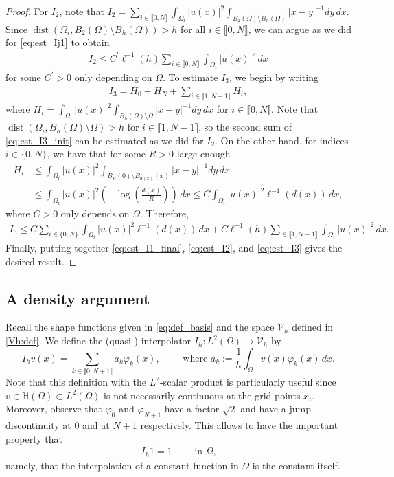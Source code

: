 \documentclass[11 pt]{article}
\newcommand\inter[1]{\llbracket #1\rrbracket}
\numberwithin{equation}{section}
\def\dist{\operatorname{dist}}
\begin{document}
\begin{proof}
For $I_2$, note that $I_2=\sum_{i\in\inter{0,N}}\int_{\Omega_i}|u(x)|^2\int_{B_2(\Omega)\setminus B_{h}(\Omega)}|x-y|^{-1}dy\,dx.$ Since $\dist(\Omega_i,B_2(\Omega)\setminus B_h(\Omega))>h$ for all $i\in\inter{0,N}$, we can argue as we did for \eqref{eq:est_Ij1} to obtain
%
\begin{align}\label{eq:est_I2}
    I_2\leq C^\prime\ell^{-1}(h)\sum_{i\in\inter{0,N}}\int_{\Omega_i}|u(x)|^2\,dx
\end{align}
%
for some $C^\prime>0$ only depending on $\Omega$. To estimate $I_3$, we begin by writing
%
\begin{align}\label{eq:est_I3_init}
    I_3=H_0+H_N+\sum_{i\in\inter{1,N-1}}H_i,
\end{align}
%
where $H_i=\int_{\Omega_i}|u(x)|^2\int_{B_h(\Omega)\setminus \Omega}|x-y|^{-1}dy\,dx$ for $i\in\inter{0,N}$. Note that $\dist(\Omega_i,B_h(\Omega)\setminus\Omega)>h$ for $i\in\inter{1,N-1}$, so the second sum of \eqref{eq:est_I3_init} can be estimated as we did for $I_2$. On the other hand, for indices $i\in\{0,N\}$, we have that for some $R>0$ large enough
%
\begin{align*}
    H_i&\leq \int_{\Omega_i}|u(x)|^2\int_{B_R(0)\setminus B_{d(x)}(x)}|x-y|^{-1}dy\,dx \\
    &\leq \int_{\Omega_i}|u(x)|^2\left(-\log\left(\tfrac{d(x)}{R}\right)\right)\,dx \leq C \int_{\Omega_i}|u(x)|^2\ell^{-1}(d(x))\,dx,
\end{align*}
%
where $C>0$ only depends on $\Omega$. Therefore,
%
\begin{align}\label{eq:est_I3}
    I_3\leq C \sum_{i\in\{0,N\}}\int_{\Omega_i}|u(x)|^2\ell^{-1}(d(x))\,dx + C\ell^{-1}(h)\sum_{\in\inter{1,N-1}}\int_{\Omega_i}|u(x)|^2\,dx.
\end{align}
%
Finally, putting together \eqref{eq:est_I1_final}, \eqref{eq:est_I2}, and \eqref{eq:est_I3} gives the desired result. 
%
\end{proof}

\subsection{A density argument}


Recall the shape functions given in \eqref{eq:def_basis} and the space $\mathcal V_h$ defined in \eqref{Vh:def}. We define the (quasi-) interpolator $I_h:L^2(\Omega)\to \mathcal V_h$ by
%
\begin{equation}\label{eq:interpolator}
I_h v(x)=\sum_{k\in\inter{0,N+1}}a_k \varphi_k(x),\qquad \text{ where }
a_k:=\frac{1}{h}\int_{\Omega}v(x)\varphi_k(x)\,dx.
\end{equation}
%
Note that this definition with the $L^2$-scalar product is particularly useful since $v\in\mathbb H(\Omega)\subset L^2(\Omega)$ is not necessarily continuous at the grid points $x_i$.  Moreover, observe that $\varphi_0$ and $\varphi_{N+1}$ have a factor $\sqrt{2}$ and have a jump discontinuity at $0$ and at $N+1$ respectively.  This allows to have the important property that
\begin{align}\label{Ihc}
I_h 1 = 1\qquad \text{ in $\Omega$,}
\end{align}
namely, that the interpolation of a constant function in $\Omega$ is the constant itself.
\end{document}
